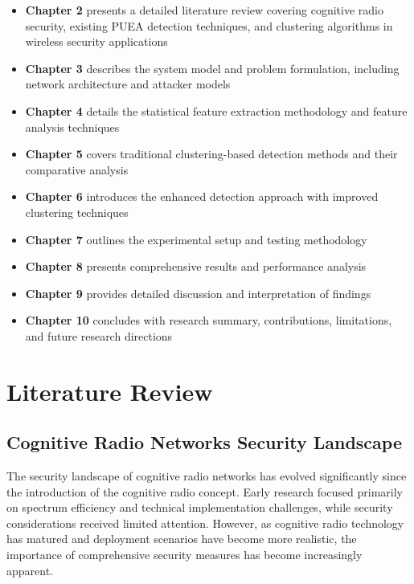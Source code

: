 \begin{itemize}
\item \textbf{Chapter 2} presents a detailed literature review covering cognitive radio security, existing PUEA detection techniques, and clustering algorithms in wireless security applications

\item \textbf{Chapter 3} describes the system model and problem formulation, including network architecture and attacker models

\item \textbf{Chapter 4} details the statistical feature extraction methodology and feature analysis techniques

\item \textbf{Chapter 5} covers traditional clustering-based detection methods and their comparative analysis

\item \textbf{Chapter 6} introduces the enhanced detection approach with improved clustering techniques

\item \textbf{Chapter 7} outlines the experimental setup and testing methodology

\item \textbf{Chapter 8} presents comprehensive results and performance analysis

\item \textbf{Chapter 9} provides detailed discussion and interpretation of findings

\item \textbf{Chapter 10} concludes with research summary, contributions, limitations, and future research directions
\end{itemize}

\chapter{Literature Review}

\section{Cognitive Radio Networks Security Landscape}
The security landscape of cognitive radio networks has evolved significantly since the introduction of the cognitive radio concept. Early research focused primarily on spectrum efficiency and technical implementation challenges, while security considerations received limited attention. However, as cognitive radio technology has matured and deployment scenarios have become more realistic, the importance of comprehensive security measures has become increasingly apparent.

